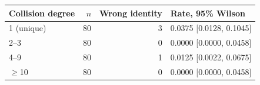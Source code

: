 \begin{tabular}{@{}lrrl@{}}
\toprule
Collision degree & $n$ & Wrong identity & Rate, 95\% Wilson \\
\midrule
1 (unique) & 80 & 3 & 0.0375 [0.0128, 0.1045] \\
2--3 & 80 & 0 & 0.0000 [0.0000, 0.0458] \\
4--9 & 80 & 1 & 0.0125 [0.0022, 0.0675] \\
$\ge$10 & 80 & 0 & 0.0000 [0.0000, 0.0458] \\
\bottomrule
\end{tabular}
